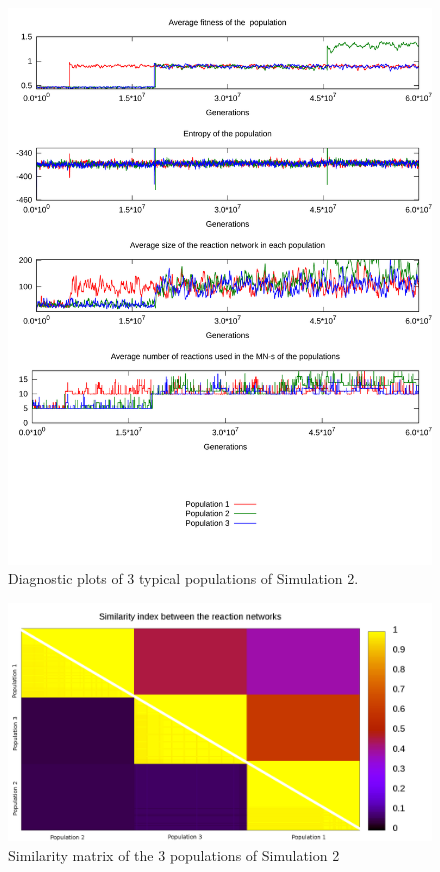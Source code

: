 \documentclass[a4paper,12pt]{article}
\begin{document}
\begin{figure}[htpb]
	\centering
	\includegraphics[width=0.8\linewidth]{simulation2.pdf}
	\caption{Diagnostic plots of 3 typical populations of Simulation 2.}
	\label{fig:simulation2}
\end{figure}

\begin{figure}[htpb]
	\centering
	\includegraphics[width=1\linewidth]{simmatrix_sim2.png}
	\caption{Similarity matrix of the $3$ populations of Simulation 2}
	\label{fig:simmatrix_sim2}
\end{figure}
\end{document}
